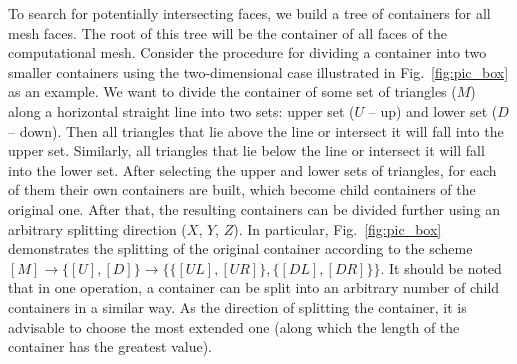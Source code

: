 \documentclass[
11pt,%
tightenlines,%
twoside,%
onecolumn,%
nofloats,%
nobibnotes,%
nofootinbib,%
superscriptaddress,%
noshowpacs,%
centertags]%
{revtex4-2}
\begin{document}
To search for potentially intersecting faces, we build a tree of containers for all mesh faces.
The root of this tree will be the container of all faces of the computational mesh.
Consider the procedure for dividing a container into two smaller containers using the two-dimensional case illustrated in Fig.~\ref{fig:pic_box} as an example.
We want to divide the container of some set of triangles ($M$) along a horizontal straight line into two sets: upper set ($U$ -- up) and lower set ($D$ -- down).
Then all triangles that lie above the line or intersect it will fall into the upper set.
Similarly, all triangles that lie below the line or intersect it will fall into the lower set.
After selecting the upper and lower sets of triangles, for each of them their own containers are built, which become child containers of the original one.
After that, the resulting containers can be divided further using an arbitrary splitting direction ($X$, $Y$, $Z$).
In particular, Fig.~\ref{fig:pic_box} demonstrates the splitting of the original container according to the scheme $[M] \rightarrow \{[U], [D]\} \rightarrow \{\{[UL], [UR]\}, \{[DL], [DR]\}\}$.
It should be noted that in one operation, a container can be split into an arbitrary number of child containers in a similar way.
As the direction of splitting the container, it is advisable to choose the most extended one (along which the length of the container has the greatest value).
\end{document}
